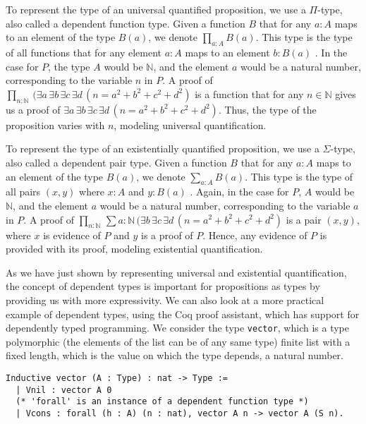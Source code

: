 To represent the type of an universal quantified proposition,
we use a $\Pi$-type, also called a dependent function type.
Given a function $B$ that for any $a : A$ maps to an
element of the type $B(a)$, we denote $\prod_{a : A} B(a)$.
This type is the type of all functions that for any element
$a : A$ maps to an element $b : B(a)$ \cite[p.~78] {lof1}.
In the case for $P$, the type $A$ would be $\mathbb{N}$,
and the element $a$ would be a natural number, corresponding to the variable $n$ in $P$.
A proof of $\prod_{n : \mathbb{N}} \, (\exists a \, \exists b \, \exists c \, \exists d \, (n = a^2 + b^2 + c^2 + d^2)$
is a function that for any $n \in \mathbb{N}$
gives us a proof of $\exists a \, \exists b \, \exists c \, \exists d \, (n = a^2 + b^2 + c^2 + d^2)$.
Thus, the type of the proposition varies with $n$,
modeling universal quantification.

To represent the type of an existentially quantified proposition,
we use a $\Sigma$-type, also called a dependent pair type.
Given a function $B$ that for any $a : A$ maps to an
element of the type $B(a)$, we denote $\sum_{a : A} B(a)$.
This type is the type of all pairs $(x, y)$ where
$x : A$ and $y : B(a)$ \cite[p.~79]{lof1}.
Again, in the case for $P$, $A$ would be $\mathbb{N}$,
and the element $a$ would be a natural number, corresponding to the variable $a$ in $P$.
A proof of $\prod_{n : \mathbb{N}} \, \sum{a : \mathbb{N}} \, (\exists b \, \exists c \, \exists d \, (n = a^2 + b^2 + c^2 + d^2)$
is a pair $(x, y)$, where $x$ is evidence of $P$
and $y$ is a proof of $P$.
Hence, any evidence of $P$ is provided with its proof,
modeling existential quantification.

As we have just shown by representing universal and existential quantification,
the concept of dependent types is important for propositions as types
by providing us with more expressivity.
We can also look at a more practical example of dependent types,
using the Coq proof assistant, which has support for dependently typed programming.
We consider the type \lstinline{vector}, which is a type polymorphic (the elements of the list can be of any same type)
finite list with a fixed length, which is the value on which the type depends, a natural number.

\begin{minipage}{\linewidth}
\begin{lstlisting}[language=Coq, label={lst:dep_type_vec}, caption={\lstinline{vector} in Coq, using dependent types}]
Inductive vector (A : Type) : nat -> Type :=
  | Vnil : vector A 0
  (* 'forall' is an instance of a dependent function type *)
  | Vcons : forall (h : A) (n : nat), vector A n -> vector A (S n).
\end{lstlisting}
\end{minipage}

